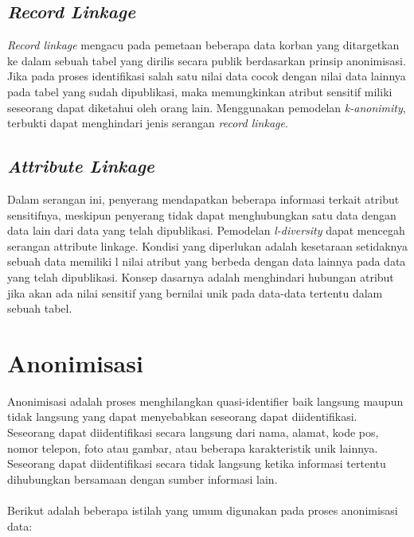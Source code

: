 \subsection{\textit{Record Linkage}}
\textit{Record linkage} mengacu pada pemetaan beberapa data korban yang ditargetkan ke dalam sebuah tabel yang dirilis secara publik berdasarkan prinsip anonimisasi. Jika pada proses identifikasi salah satu nilai data cocok dengan nilai data lainnya pada tabel yang sudah dipublikasi, maka memungkinkan atribut sensitif miliki seseorang dapat diketahui oleh orang lain. Menggunakan pemodelan \textit{k-anonimity}, terbukti dapat menghindari jenis serangan \textit{record linkage}.

\subsection{\textit{Attribute Linkage}} 
Dalam serangan ini, penyerang mendapatkan beberapa informasi terkait atribut sensitifnya, meskipun penyerang tidak dapat menghubungkan satu data dengan data lain dari data yang telah dipublikasi. Pemodelan \textit{l-diversity} dapat mencegah serangan attribute linkage. Kondisi yang diperlukan adalah kesetaraan setidaknya sebuah data memiliki l nilai atribut yang berbeda dengan data lainnya pada data yang telah dipublikasi. Konsep dasarnya adalah menghindari hubungan atribut jika akan ada nilai sensitif yang bernilai unik pada data-data tertentu dalam sebuah tabel.

\section{Anonimisasi}
\label{sec:anonimisasi}
Anonimisasi adalah proses menghilangkan quasi-identifier baik langsung maupun tidak langsung yang dapat menyebabkan seseorang dapat diidentifikasi. Seseorang dapat diidentifikasi secara langsung dari nama, alamat, kode pos, nomor telepon, foto atau gambar, atau beberapa karakteristik unik lainnya. Seseorang dapat diidentifikasi secara tidak langsung ketika informasi tertentu dihubungkan bersamaan dengan sumber informasi lain.
\\\\
Berikut adalah beberapa istilah yang umum digunakan pada proses anonimisasi data: 

